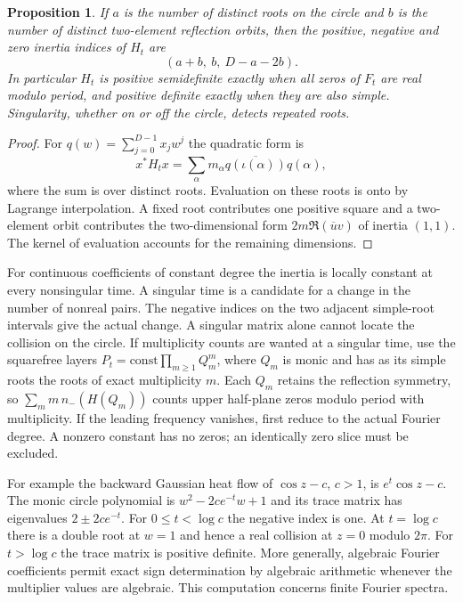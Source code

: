 \documentclass[11pt]{article}
\newtheorem{proposition}[theorem]{Proposition}
\begin{document}
\begin{proposition}
If $a$ is the number of distinct roots on the circle and $b$ is the
number of distinct two-element reflection orbits, then the positive,
negative and zero inertia indices of $H_t$ are
\[
 (a+b,\ b,\ D-a-2b).
\]
In particular $H_t$ is positive semidefinite exactly when all zeros
of $F_t$ are real modulo period, and positive definite exactly when
they are also simple. Singularity, whether on or off the circle,
detects repeated roots.
\end{proposition}

\begin{proof}
For $q(w)=\sum_{j=0}^{D-1}x_jw^j$ the quadratic form is
\[
 x^*H_tx=\sum_{\alpha}m_\alpha
 \overline{q(\iota(\alpha))}q(\alpha),
\]
where the sum is over distinct roots. Evaluation on these roots is
onto by Lagrange interpolation. A fixed root contributes one positive
square and a two-element orbit contributes the two-dimensional form
$2m\Re(\overline{u}v)$ of inertia $(1,1)$. The kernel of evaluation
accounts for the remaining dimensions.
\end{proof}

For continuous coefficients of constant degree the inertia is locally
constant at every nonsingular time. A singular time is a candidate for
a change in the number of nonreal pairs. The negative indices on the
two adjacent simple-root intervals give the actual change. A singular
matrix alone cannot locate the collision on the circle. If multiplicity
counts are wanted at a singular time, use the squarefree layers
$P_t=\mathrm{const}\prod_{m\ge1}Q_m^m$, where $Q_m$ is monic and has
as its simple roots the roots of exact multiplicity $m$. Each $Q_m$
retains the reflection symmetry, so $\sum_m m\,n_-(H(Q_m))$ counts
upper half-plane zeros modulo period with multiplicity. If the leading
frequency vanishes, first reduce to the actual Fourier degree.
A nonzero constant has no zeros; an identically zero slice must be
excluded.

For example the backward Gaussian heat flow of $\cos z-c$, $c>1$, is
$e^t\cos z-c$. The monic circle polynomial is
$w^2-2ce^{-t}w+1$ and its trace matrix has eigenvalues
$2\pm2ce^{-t}$. For $0\le t<\log c$ the negative index is one.
At $t=\log c$ there is a double root at $w=1$ and hence a real collision
at $z=0$ modulo $2\pi$. For $t>\log c$ the trace matrix is positive
definite. More generally, algebraic Fourier coefficients permit exact
sign determination by algebraic arithmetic whenever the multiplier
values are algebraic. This computation concerns finite Fourier spectra.
\end{document}
